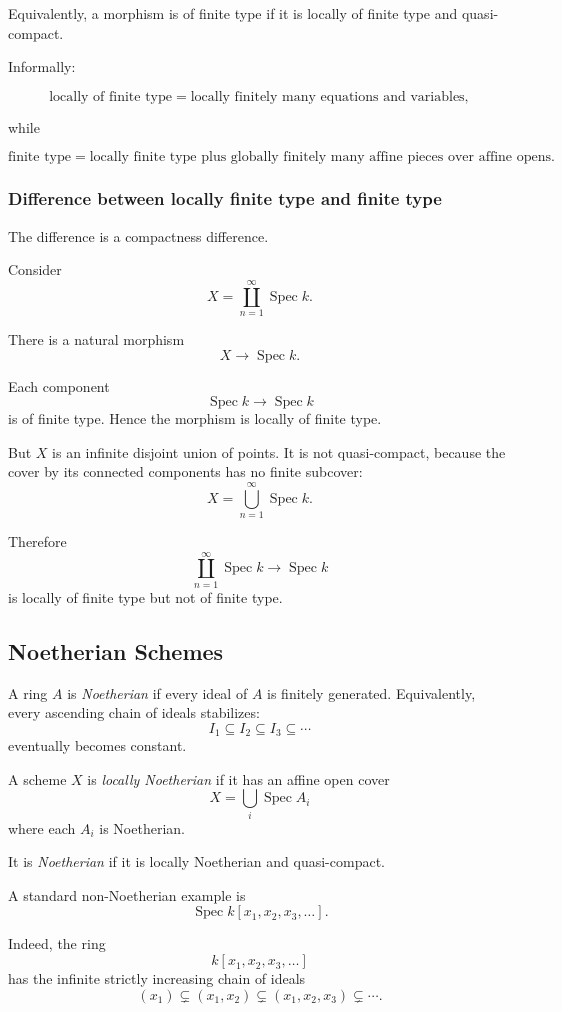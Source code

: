 \documentclass[12pt,a4paper]{article}
\theoremstyle{notespace}
\begin{document}
Equivalently, a morphism is of finite type if it is locally of finite type and quasi-compact.

Informally:

\[
\text{locally of finite type}
=
\text{locally finitely many equations and variables},
\]

while

\[
\text{finite type}
=
\text{locally finite type plus globally finitely many affine pieces over affine opens}.
\]

\subsubsection*{Difference between locally finite type and finite type}

The difference is a compactness difference.

Consider
\[
X=\coprod_{n=1}^{\infty}\operatorname{Spec}k.
\]

There is a natural morphism
\[
X\to \operatorname{Spec}k.
\]

Each component
\[
\operatorname{Spec}k\to \operatorname{Spec}k
\]
is of finite type. Hence the morphism is locally of finite type.

But \(X\) is an infinite disjoint union of points. It is not quasi-compact, because the cover by its connected components has no finite subcover:
\[
X=\bigcup_{n=1}^{\infty}\operatorname{Spec}k.
\]

Therefore
\[
\coprod_{n=1}^{\infty}\operatorname{Spec}k
\to
\operatorname{Spec}k
\]
is locally of finite type but not of finite type.

\subsection{Noetherian Schemes}

A ring \(A\) is \emph{Noetherian} if every ideal of \(A\) is finitely generated. Equivalently, every ascending chain of ideals stabilizes:
\[
I_1\subseteq I_2\subseteq I_3\subseteq \cdots
\]
eventually becomes constant.

A scheme \(X\) is \emph{locally Noetherian} if it has an affine open cover
\[
X=\bigcup_i \operatorname{Spec}A_i
\]
where each \(A_i\) is Noetherian.

It is \emph{Noetherian} if it is locally Noetherian and quasi-compact.

A standard non-Noetherian example is
\[
\operatorname{Spec}k[x_1,x_2,x_3,\dots].
\]

Indeed, the ring
\[
k[x_1,x_2,x_3,\dots]
\]
has the infinite strictly increasing chain of ideals
\[
(x_1)
\subsetneq
(x_1,x_2)
\subsetneq
(x_1,x_2,x_3)
\subsetneq
\cdots.
\]
\end{document}
